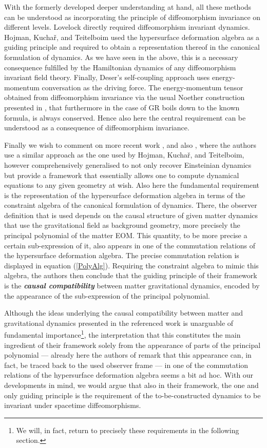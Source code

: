 With the formerly developed deeper understanding at hand, all these methods can be understood as incorporating the principle of diffeomorphism invariance on different levels. Lovelock directly required diffeomorphism invariant dynamics. Hojman, Kuchař, and Teitelboim used the hypersurface deformation algebra as a guiding principle and required to obtain a representation thereof in the canonical formulation of dynamics. As we have seen in the above, this is a necessary consequence fulfilled by the Hamiltonian dynamics of any diffeomorphism invariant field theory. Finally, Deser's self-coupling approach uses energy-momentum conversation as the driving force. The energy-momentum tensor obtained from diffeomorphism invariance via the usual Noether construction presented in \cite{Gotay1992StressEnergyMomentumTA}, that furthermore in the case of GR boils down to the known formula, is always conserved. Hence also here the central requirement can be understood as a consequence of diffeomorphism invariance. 

Finally we wish to comment on more recent work \cite{2018PhRvD..97h4036D}, \cite{2012PhRvD..85j4042G} and also \cite{2017arXiv170803870S}, where the authors use a similar approach as the one used by Hojman, Kuchař, and Teitelboim, however comprehensively generalised to not only recover Einsteinian dynamics but provide a framework that essentially allows one to compute dynamical equations to any given geometry at wish. Also here the fundamental requirement is the representation of the hypersurface deformation algebra in terms of the constraint algebra of the canonical formulation of dynamics. There, the observer definition that is used depends on the causal structure of given matter dynamics that use the gravitational field as background geometry, more precisely the principal polynomial of the matter EOM. This quantity, to be more precise a certain sub-expression of it, also appears in one of the commutation relations of the hypersurface deformation algebra. The precise commutation relation is displayed in equation (\ref{PolyAlg}).   Requiring the constraint algebra to mimic this algebra, the authors then conclude that the guiding principle of their framework is the \textit{\textbf{causal compatibility}} between matter gravitational dynamics, encoded by the appearance of the sub-expression of the principal polynomial.

Although the ideas underlying the causal compatibility between matter and gravitational dynamics presented in the referenced work is unarguable of fundamental importance\footnote{We will, in fact, return to precisely these requirements in the following section.}, the interpretation that this constitutes the main ingredient of their framework solely from the appearance of parts of the principal polynomial --- already here the authors of \cite{2018PhRvD..97h4036D} remark that this appearance can, in fact, be traced back to the used observer frame --- in one of the commutation relations of the hypersurface deformation algebra seems a bit ad hoc.
With our developments in mind, we would argue that also in their framework, the one and only guiding principle is the requirement of the to-be-constructed dynamics to be invariant under spacetime diffeomorphisms.

